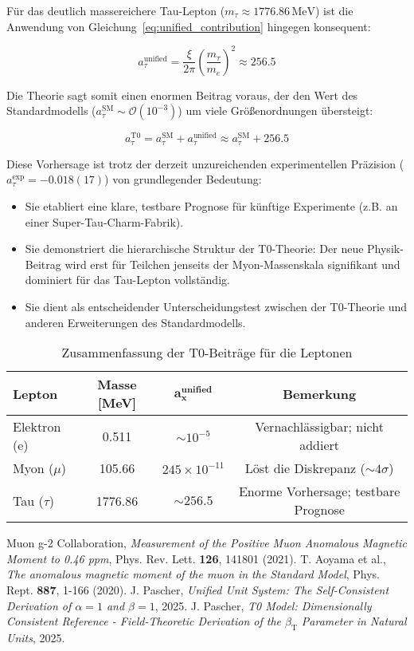 \documentclass[12pt,a4paper]{article}
\newcommand{\betaT}{\beta_{\text{T}}}
\newcommand{\xipar}{\xi}
\begin{document}
	Für das deutlich massereichere Tau-Lepton (\(m_\tau \approx 1776.86 \, \text{MeV}\)) ist die Anwendung von Gleichung~\ref{eq:unified_contribution} hingegen konsequent:
	
	\[
	a_\tau^{\text{unified}} = \frac{\xipar}{2\pi} \left( \frac{m_\tau}{m_e} \right)^2 \approx 256.5
	\]
	
	Die Theorie sagt somit einen enormen Beitrag voraus, der den Wert des Standardmodells (\(a_\tau^{\text{SM}} \sim \mathcal{O}(10^{-3})\)) um viele Größenordnungen übersteigt:
	
	\[
	a_\tau^{\text{T0}} = a_\tau^{\text{SM}} + a_\tau^{\text{unified}} \approx a_\tau^{\text{SM}} + 256.5
	\]
	
	Diese Vorhersage ist trotz der derzeit unzureichenden experimentellen Präzision (\(a_\tau^{\text{exp}} = -0.018(17)\)) von grundlegender Bedeutung:
	\begin{itemize}
		\item Sie etabliert eine klare, testbare Prognose für künftige Experimente (z.B. an einer Super-Tau-Charm-Fabrik).
		\item Sie demonstriert die hierarchische Struktur der T0-Theorie: Der neue Physik-Beitrag wird erst für Teilchen jenseits der Myon-Massenskala signifikant und dominiert für das Tau-Lepton vollständig.
		\item Sie dient als entscheidender Unterscheidungstest zwischen der T0-Theorie und anderen Erweiterungen des Standardmodells.
	\end{itemize}
	
	\begin{table}[h]
		\centering
		\caption{Zusammenfassung der T0-Beiträge für die Leptonen}
		\begin{tabular}{lccc}
			\hline
			\textbf{Lepton} & \textbf{Masse [MeV]} & \(\mathbf{a_x^{\text{unified}}}\) & \textbf{Bemerkung} \\
			\hline
			Elektron (e)  & 0.511 & \(\sim 10^{-5}\) & Vernachlässigbar; nicht addiert \\
			Myon ($\mu$)  & 105.66 & \(245 \times 10^{-11}\) & Löst die Diskrepanz (\(\sim 4\sigma\)) \\
			Tau ($\tau$)  & 1776.86 & \(\sim 256.5\) & Enorme Vorhersage; testbare Prognose \\
			\hline
		\end{tabular}
	\end{table}
	
	\begin{thebibliography}{99}
		 Muon g-2 Collaboration, \textit{Measurement of the Positive Muon Anomalous Magnetic Moment to 0.46 ppm}, Phys. Rev. Lett. \textbf{126}, 141801 (2021).
		 T. Aoyama et al., \textit{The anomalous magnetic moment of the muon in the Standard Model}, Phys. Rept. \textbf{887}, 1-166 (2020).
		 J. Pascher, \textit{Unified Unit System: The Self-Consistent Derivation of  $\alpha = 1$ and $\beta = 1$}, 2025.
		 J. Pascher, \textit{T0 Model: Dimensionally Consistent Reference - Field-Theoretic Derivation of the  $\betaT$ Parameter in Natural Units}, 2025.
	\end{thebibliography}
	
\end{document}
